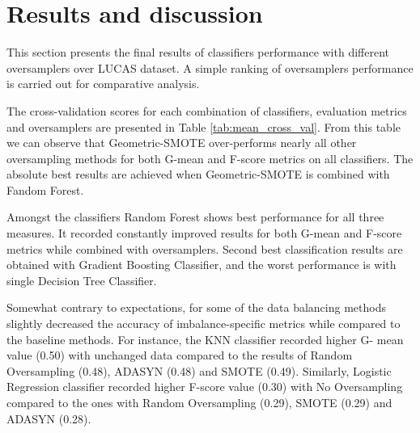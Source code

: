 \documentclass[remotesensing,article,submit,moreauthors,pdftex]{Definitions/mdpi}
\begin{document}
\section{Results and discussion}

This section presents the final results of classifiers performance with
different oversamplers over LUCAS dataset. A simple ranking of oversamplers
performance is carried out for comparative analysis.

The cross-validation scores for each combination of classifiers, evaluation
metrics and oversamplers are presented in Table \ref{tab:mean_cross_val}. From
this table we can observe that Geometric-SMOTE over-performs nearly all other
oversampling methods for both G-mean and F-score metrics on all classifiers. The
absolute best results are achieved when Geometric-SMOTE is combined with Fandom
Forest.


Amongst the classifiers Random Forest shows best performance for all three
measures. It recorded constantly improved results for both G-mean and F-score
metrics while combined with oversamplers. Second best classification results are
obtained with Gradient Boosting Classifier, and the worst performance is with
single Decision Tree Classifier.

Somewhat contrary to expectations, for some of the data balancing methods
slightly decreased the accuracy of imbalance-specific metrics while compared to
the baseline methods. For instance, the KNN classifier recorded higher G- mean
value (0.50) with unchanged data compared to the results of Random Oversampling
(0.48), ADASYN (0.48) and SMOTE (0.49). Similarly, Logistic Regression
classifier recorded higher F-score value (0.30) with No Oversampling compared to
the ones with Random Oversampling (0.29), SMOTE (0.29) and ADASYN (0.28).
\end{document}
